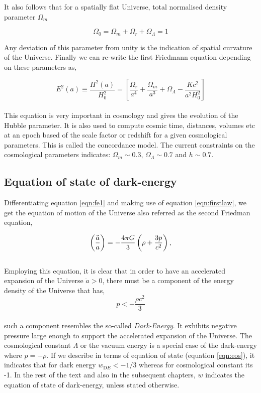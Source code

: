 It also follows that for a spatially flat Universe, total normalised 
density parameter $\Omega_m$

\begin{equation}
	\Omega_0 = \Omega_m + \Omega_r + \Omega_{\Lambda} = 1
\end{equation}

Any deviation of this 
parameter from unity is the indication of spatial curvature of the Universe.
Finally we can re-write the first Friedmann equation depending on these parameters as,

\begin{equation}
	E^2(a) \equiv \dfrac{H^2(a)}{H_0^2} = \left[\dfrac{\Omega_r}{a^4}
	 + \dfrac{\Omega_m}{a^3} +
	 \Omega_{\Lambda} - \dfrac{Kc^2}{a^2H_0^2}  \right]
	 \label{eqn:hubbleparameter}
\end{equation}
\\
This equation is very important in cosmology and gives the evolution of the 
Hubble parameter. It is also used to compute cosmic time, distances, volumes
etc at an epoch based of the scale factor or redshift for a given cosmological
parameters. This is called the concordance model. The current constraints on the
cosmological parameters indicates: $\Omega_m \sim 0.3$, $\Omega_{\Lambda} \sim 0.7$
and $h \sim 0.7$.


\subsection{Equation of state of dark-energy}

Differentiating equation \ref{eqn:fe1} and making use of equation
\ref{eqn:firstlaw}, we get the equation of motion of the Universe
also referred as the second Friedman equation,

\begin{equation}
\centering
		\left( \dfrac{\ddot{a}}{a} \right) = -\dfrac{4 \pi G}{3} 
			\left( \rho + \dfrac{3p}{c^2} \right),
\label{eqn:fe2}
\end{equation}
\\
Employing this equation, it is clear that in order to have an 
accelerated expansion of the Universe $\ddot{a}>0$,
there must be a component of the energy density of the Universe that has,
\begin{equation}
	p < -\dfrac{\rho c^2}{3} 
\end{equation}
\\
such a component resembles the so-called {\it Dark-Energy}. It exhibits 
negative pressure large enough to support the accelerated expansion of the
Universe. The cosmological constant $\Lambda$  or the vacuum energy is a 
special case of the dark-energy where $p=-\rho$. If we describe in terms 
of equation of state (equation \ref{eqn:eos}), it indicates that for 
dark energy $w_{\mathrm DE}<-1/3$ whereas for cosmological constant its -1.
In the rest of the text and also in the subsequent chapters, $w$ indicates
the equation of state of dark-energy, unless stated otherwise.

